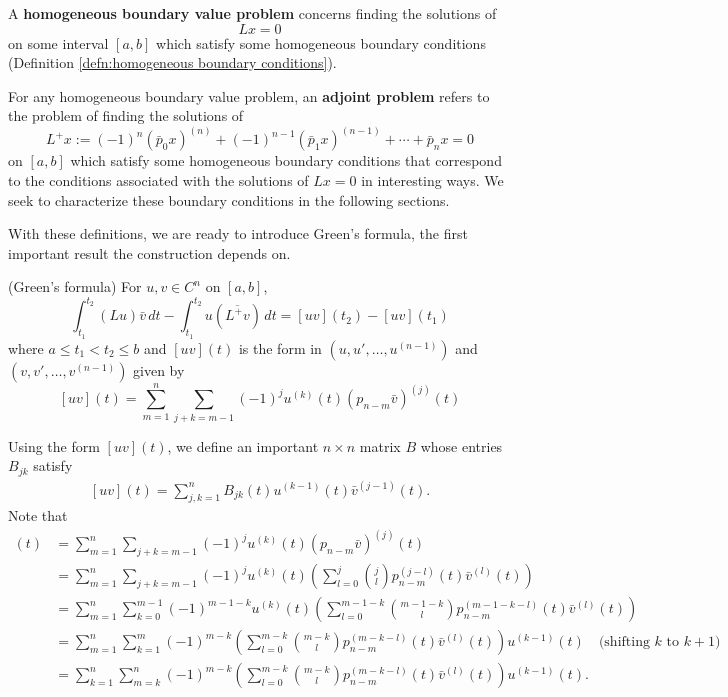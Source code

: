 \documentclass[11pt, oneside, a4paper]{article}
\begin{document}
\begin{defn}\label{defn:homogeneous boundary value problem}
    A \textbf{homogeneous boundary value problem} concerns finding the solutions of 
    \[Lx=0\] on some interval $[a,b]$ which satisfy some homogeneous boundary conditions (Definition \ref{defn:homogeneous boundary conditions}).
\end{defn}

For any homogeneous boundary value problem, an \textbf{adjoint problem} refers to the problem of finding the solutions of
\[L^{+}x:=(-1)^n(\bar{p}_0x)^{(n)}+(-1)^{n-1}(\bar{p}_1x)^{(n-1)}+\cdots+\bar{p}_nx=0\]
on $[a,b]$ which satisfy some homogeneous boundary conditions that correspond to the conditions associated with the solutions of $Lx=0$ in interesting ways. We seek to characterize these boundary conditions in the following sections.

With these definitions, we are ready to introduce Green's formula, the first important result the construction depends on.

\begin{thm}{(Green's formula)}\label{thm:green's formula}
    For $u, v\in C^n$ on $[a,b]$,
    \begin{equation}\label{eq:green's formula}
        \int_{t_1}^{t_2}(Lu)\bar{v}\,dt - \int_{t_1}^{t_2}u(\overline{L^+v})\,dt = [uv](t_2) - [uv](t_1) 
    \end{equation}
    where $a\leq t_1<t_2\leq b$ and $[uv](t)$ is the form in $(u, u', \ldots, u^{(n-1)})$ and $(v, v', \ldots, v^{(n-1)})$ given by
    \begin{equation}\label{eq:[uv](t) defn}
        [uv](t)=\sum_{m=1}^n\sum_{j+k=m-1}(-1)^j u^{(k)}(t)(p_{n-m}\bar{v})^{(j)}(t)
    \end{equation}
\end{thm}

Using the form $[uv](t)$, we define an important $n\times n$ matrix $B$ whose entries $B_{jk}$ satisfy
\begin{equation}\label{eq:[uv](t) in B matrix}
    \begin{split}
        [uv](t) = \sum_{j,k=1}^n B_{jk}(t)u^{(k-1)}(t)\bar{v}^{(j-1)}(t).
    \end{split}
\end{equation}
Note that
\begin{align*}
    [uv](t) &= \sum_{m=1}^n\sum_{j+k=m-1}(-1)^j u^{(k)}(t)(p_{n-m}\bar{v})^{(j)}(t)\\
        &= \sum_{m=1}^n\sum_{j+k=m-1}(-1)^j u^{(k)}(t)\left(\sum_{l=0}^j\binom{j}{l}p_{n-m}^{(j-l)}(t)\bar{v}^{(l)}(t)\right)\\
        &= \sum_{m=1}^n\sum_{k=0}^{m-1}(-1)^{m-1-k} u^{(k)}(t)\left(\sum_{l=0}^{m-1-k}\binom{m-1-k}{l}p_{n-m}^{(m-1-k-l)}(t)\bar{v}^{(l)}(t)\right)\\
        &= \sum_{m=1}^n\sum_{k=1}^{m}(-1)^{m-k}\left(\sum_{l=0}^{m-k}\binom{m-k}{l}p_{n-m}^{(m-k-l)}(t)\bar{v}^{(l)}(t)\right)u^{(k-1)}(t)\quad\mbox{(shifting $k$ to $k+1$)}\\
        &= \sum_{k=1}^n\sum_{m=k}^n (-1)^{m-k}\left(\sum_{l=0}^{m-k}\binom{m-k}{l}p_{n-m}^{(m-k-l)}(t)\bar{v}^{(l)}(t)\right)u^{(k-1)}(t).
\end{align*}
\end{document}
